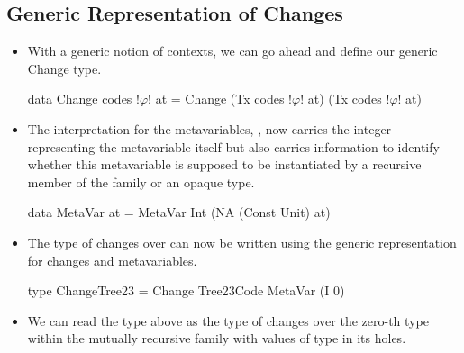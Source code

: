 \subsection{Generic Representation of Changes}
\begin{itemize}
    \item With a generic notion of contexts, we can go ahead and define our generic Change type.
    \begin{haskell}
        data Change codes !$\varphi$! at = Change (Tx codes !$\varphi$! at) (Tx codes !$\varphi$! at)
    \end{haskell}
    \item The interpretation for the metavariables, , now carries the integer representing the metavariable itself but also carries information to identify whether this metavariable is supposed to be instantiated by a recursive member of the family or an opaque type.
    \begin{haskell}
        data MetaVar at = MetaVar Int (NA (Const Unit) at)
    \end{haskell}
    \item The type of changes over  can now be written using the generic representation for changes and metavariables.
    \begin{haskell}
        type ChangeTree23 = Change Tree23Code MetaVar (I 0)
    \end{haskell}
    \item We can read the type above as the type of changes over the zero-th  type within the mutually recursive family  with values of type  in its holes.
\end{itemize}

\newpage

